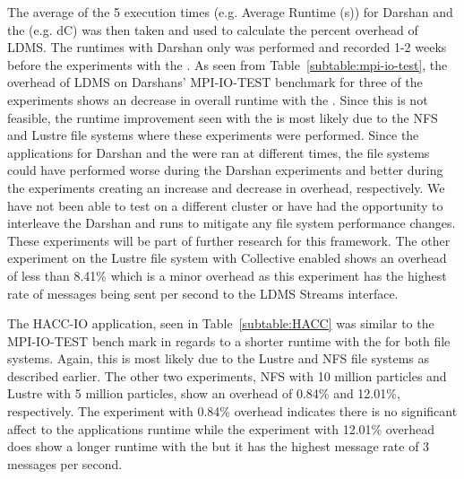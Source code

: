 The average of the 5 execution times (e.g. Average Runtime (s)) for Darshan and the \connector{} (e.g. dC) was then taken and used to calculate the percent overhead of LDMS. The runtimes with Darshan only was performed and recorded 1-2 weeks before the experiments with the \connector. As seen from Table~\ref{subtable:mpi-io-test}, the overhead of LDMS on Darshans' MPI-IO-TEST benchmark for three of the experiments shows an decrease in overall runtime with the \connector. Since this is not feasible, the runtime improvement seen with the \connector is most likely due to the NFS and Lustre file systems where these experiments were performed. Since the applications for Darshan and the \connector were ran at different times, the file systems could have performed worse during the Darshan experiments and better during the \connector experiments creating an increase and decrease in overhead, respectively. We have not been able to test on a different cluster or have had the opportunity to interleave the Darshan and \connector runs to mitigate any file system performance changes. These experiments will be part of further research for this framework. The other experiment on the Lustre file system with Collective enabled shows an overhead of less than 8.41\% which is a minor overhead as this experiment has the highest rate of messages being sent per second to the LDMS Streams interface.   

The HACC-IO application, seen in Table~\ref{subtable:HACC} was similar to the MPI-IO-TEST bench mark in regards to a shorter runtime with the \connector for both file systems. Again, this is most likely due to the Lustre and NFS file systems as described earlier. The other two experiments, NFS with 10 million particles and Lustre with 5 million particles, show an overhead of 0.84\% and 12.01\%, respectively. The experiment with 0.84\% overhead indicates there is no significant affect to the applications runtime while the experiment with 12.01\% overhead does show a longer runtime with the \connector but it has the highest message rate of 3 messages per second.


